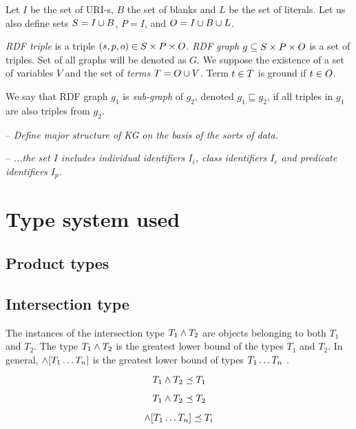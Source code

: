 \documentclass[runningheads]{llncs}
\newcommand{\notes}[1]{\noindent\begin{small}-- \emph{#1}\\\end{small}}
\begin{document}
Let $I$ be the set of URI-s, $B$ the set of blanks and $L$ be the set
of literals. Let us also define sets $S = I\cup\/B$, $P = I$, and
$O = I\cup\/B\cup\/L$.

\emph{RDF triple} is a triple $(s,p,o)\in\/S\times\/P\times\/O$.
\emph{RDF graph} $g\subseteq\/S\times\/P\times\/O$ is a set of
triples. Set of all graphs will be denoted as $G$. We suppose the
existence of a set of variables $V$ and the set of \emph{terms}
$T = O\cup\/V$. Term $t\in\/T$ is ground if $t\in\/O$.

We say that RDF graph $g_1$ is \emph{sub-graph} of $g_2$, denoted
$g_1 \sqsubseteq g_2$, if all triples in $g_1$ are also triples from
$g_2$. 

\notes{Define major structure of KG on the basis of the sorts of data.}
\notes{...the set $I$ includes individual identifiers $I_i$, class identifiers $I_c$ and predicate identifiers $I_p$.}










\section{Type system used}

\subsection{Product types}

\subsection{Intersection type}

The instances of the intersection type $T_1\land\/T_2$ are objects
belonging to both $T_1$ and $T_2$. The type $T_1\land\/T_2$ is the
greatest lower bound of the types $T_1$ and $T_2$. In general,
$\land[T_1\ldots\/T_n]$ is the greatest lower bound of types
$T_1\ldots\/T_n$ \cite{Pierce91IntersectUnion,Pierce96IntersectionTypes}.

\begin{equation}
T_1\land\/T_2\preceq\/T_1    
\end{equation}

\begin{equation}
T_1\land\/T_2\preceq\/T_2  
\end{equation}

\begin{equation}
\land[T_1\ldots\/T_n] \preceq\/T_i  
\end{equation}
\end{document}

